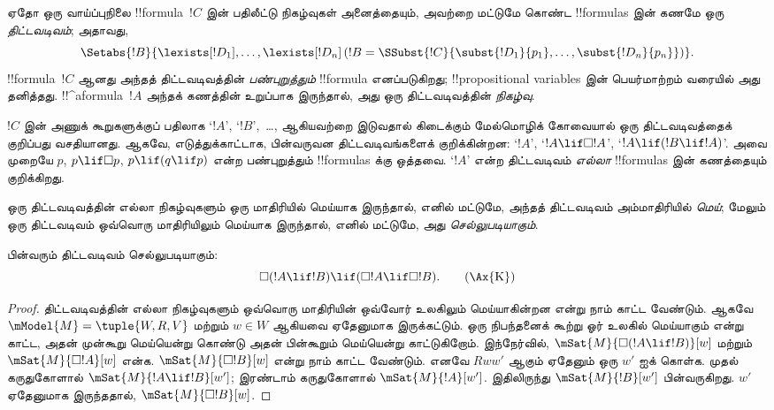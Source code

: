 \documentclass[../../../include/open-logic-section]{subfiles}
\begin{document}


\begin{defn}
  ஏதோ ஒரு வாய்ப்புநிலை !!{formula}~$!C$ இன் பதிலீட்டு நிகழ்வுகள்
  அனைத்தையும், அவற்றை மட்டுமே கொண்ட !!{formula}s இன் கணமே ஒரு
  \emph{திட்டவடிவம்}; அதாவது,
  \[
  \Setabs{!B}{\lexists[!D_1], \dots, \lexists[!D_n] \left(!B =
  \SSubst{!C}{\subst{!D_1}{p_1}, \dots, \subst{!D_n}{p_n}} \right) }.
  \]
  !!{formula}~$!C$ ஆனது அந்தத் திட்டவடிவத்தின் \emph{பண்புறுத்தும்}
  !!{formula} எனப்படுகிறது; !!{propositional variable}s இன் பெயர்மாற்றம்
  வரையில் அது தனித்தது. !!^a{formula}~$!A$ அந்தக் கணத்தின் உறுப்பாக
  இருந்தால், அது ஒரு திட்டவடிவத்தின் \emph{நிகழ்வு}.
\end{defn}

$!C$ இன் அணுக் கூறுகளுக்குப் பதிலாக `$!A$', `$!B$',~\dots, ஆகியவற்றை
இடுவதால் கிடைக்கும் மேல்மொழிக் கோவையால் ஒரு திட்டவடிவத்தைக் குறிப்பது
வசதியானது. ஆகவே, எடுத்துக்காட்டாக, பின்வருவன திட்டவடிவங்களைக் குறிக்கின்றன:
`$!A$', `$!A \lif \Box!A$', `$!A \lif (!B \lif !A)$'. அவை முறையே
$p$, $p \lif \Box p$, $p \lif (q \lif p)$ என்ற பண்புறுத்தும்
!!{formula}s க்கு ஒத்தவை. `$!A$' என்ற திட்டவடிவம் \emph{எல்லா}
!!{formula}s இன் கணத்தையும் குறிக்கிறது.

\begin{defn}
  ஒரு திட்டவடிவத்தின் எல்லா நிகழ்வுகளும் ஒரு மாதிரியில் மெய்யாக இருந்தால்,
  எனில் மட்டுமே, அந்தத் திட்டவடிவம் அம்மாதிரியில் \emph{மெய்}; மேலும் ஒரு
  திட்டவடிவம் ஒவ்வொரு மாதிரியிலும் மெய்யாக இருந்தால், எனில் மட்டுமே, அது
  \emph{செல்லுபடியாகும்}.
\end{defn}

\begin{prop}
  பின்வரும் திட்டவடிவம்  செல்லுபடியாகும்:
  \begin{equation*}
  \Box(!A \lif !B) \lif (\Box !A \lif \Box !B). \tag{\Ax{K}}
  \end{equation*}
\end{prop}

\begin{proof}
  திட்டவடிவத்தின் எல்லா நிகழ்வுகளும் ஒவ்வொரு மாதிரியின் ஒவ்வோர் உலகிலும்
  மெய்யாகின்றன என்று நாம் காட்ட வேண்டும். ஆகவே $\mModel{M} =
  \tuple{W,R,V}$ மற்றும் $w \in W$ ஆகியவை ஏதேனுமாக இருக்கட்டும். ஒரு
  நிபந்தனைக் கூற்று ஓர் உலகில் மெய்யாகும் என்று காட்ட, அதன் முன்கூறு
  மெய்யென்று கொண்டு அதன் பின்கூறும் மெய்யென்று காட்டுகிறோம். இந்நேர்வில்,
  $\mSat{M}{\Box(!A \lif !B)}[w]$ மற்றும் $\mSat{M}{\Box !A}[w]$ என்க.
  $\mSat{M}{\Box !B}[w]$ என்று நாம் காட்ட வேண்டும். எனவே $Rww'$ ஆகும்
  ஏதேனும் ஒரு $w'$ ஐக் கொள்க. முதல் கருதுகோளால்
  $\mSat{M}{!A \lif !B}[w']$; இரண்டாம் கருதுகோளால்
  $\mSat{M}{!A}[w']$. இதிலிருந்து $\mSat{M}{!B}[w']$ பின்வருகிறது. $w'$
  ஏதேனுமாக இருந்ததால், $\mSat{M}{\Box !B}[w]$.
\end{proof}
\end{document}
